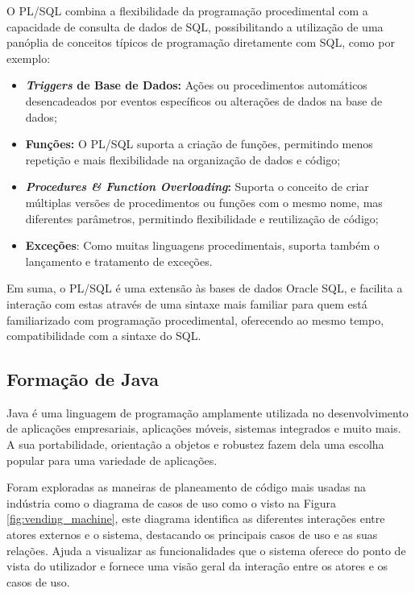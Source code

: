       O PL/SQL combina a flexibilidade da programação procedimental com a capacidade de consulta de dados de SQL, possibilitando a utilização de uma panóplia de conceitos típicos de programação diretamente com SQL, como por exemplo:
      \begin{itemize}
          \item \textbf{\textit{Triggers} de Base de Dados:} Ações ou procedimentos automáticos desencadeados por eventos específicos ou alterações de dados na base de dados;
          
          \item \textbf{Funções:} O PL/SQL suporta a criação de funções, permitindo menos repetição e mais flexibilidade na organização de dados e código;
          
          \item \textbf{\textit{Procedures \& Function Overloading}:} Suporta o conceito de criar múltiplas versões de procedimentos ou funções com o mesmo nome, mas diferentes parâmetros, permitindo flexibilidade e reutilização de código;

          \item \textbf{Exceções}: Como muitas linguagens procedimentais, suporta também o lançamento e tratamento de exceções.
      \end{itemize}
      
      Em suma, o PL/SQL é uma extensão às bases de dados Oracle SQL, e facilita a interação com estas através de uma sintaxe mais familiar para quem está familiarizado com programação procedimental, oferecendo ao mesmo tempo, compatibilidade com a sintaxe do SQL\cite{sql-language-reference}.

    \subsection{Formação de Java}\label{subsec:java}

      Java é uma linguagem de programação amplamente utilizada no desenvolvimento de aplicações empresariais, aplicações móveis, sistemas integrados e muito mais. A sua portabilidade, orientação a objetos e robustez fazem dela uma escolha popular para uma variedade de aplicações.

      Foram exploradas as maneiras de planeamento de código mais usadas na indústria como o diagrama de casos de uso como o visto na Figura \ref{fig:vending_machine}, este diagrama identifica as diferentes interações entre atores externos e o sistema, destacando os principais casos de uso e as suas relações. Ajuda a visualizar as funcionalidades que o sistema oferece do ponto de vista do utilizador e fornece uma visão geral da interação entre os atores e os casos de uso.
      

